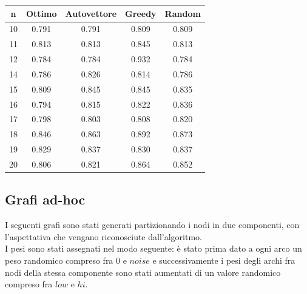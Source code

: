 \documentclass{article}
\begin{document}
\begin{center}
    \begin{tabular}{|c|c|c|c|c|}
        \hline
        n & Ottimo & Autovettore & Greedy & Random \\
        \hline
        \hline
        10 & 0.791 & 0.791 & 0.809 & 0.809 \\
        11 & 0.813 & 0.813 & 0.845 & 0.813 \\
        12 & 0.784 & 0.784 & 0.932 & 0.784 \\
        14 & 0.786 & 0.826 & 0.814 & 0.786 \\
        15 & 0.809 & 0.845 & 0.845 & 0.835 \\
        16 & 0.794 & 0.815 & 0.822 & 0.836 \\
        17 & 0.798 & 0.803 & 0.808 & 0.820 \\
        18 & 0.846 & 0.863 & 0.892 & 0.873 \\
        19 & 0.829 & 0.837 & 0.830 & 0.837 \\
        20 & 0.806 & 0.821 & 0.864 & 0.852 \\
        \hline
    \end{tabular}
\end{center}

\subsection{Grafi ad-hoc}
I seguenti grafi sono stati generati partizionando i nodi in due componenti,
con l'aspettativa che vengano riconosciute dall'algoritmo.\\
I pesi sono stati assegnati nel modo seguente: \`e stato prima dato a ogni arco un peso
randomico compreso fra $0$ e $noise$ e successivamente i pesi degli archi fra
nodi della stessa componente sono stati aumentati di un valore randomico compreso fra $low$ e $hi$.
\end{document}
